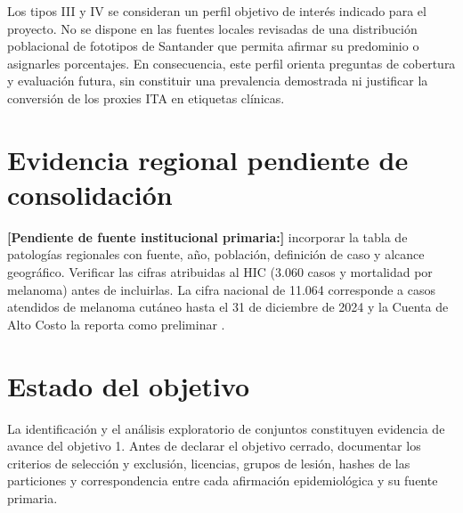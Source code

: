 Los tipos III y IV se consideran un perfil objetivo de interés indicado para el proyecto. No se dispone en las fuentes locales revisadas de una distribución poblacional de fototipos de Santander que permita afirmar su predominio o asignarles porcentajes. En consecuencia, este perfil orienta preguntas de cobertura y evaluación futura, sin constituir una prevalencia demostrada ni justificar la conversión de los proxies ITA en etiquetas clínicas.

\section{Evidencia regional pendiente de consolidación}

\noindent\textbf{[Pendiente de fuente institucional primaria:]} incorporar la tabla de patologías regionales con fuente, año, población, definición de caso y alcance geográfico. Verificar las cifras atribuidas al HIC (3.060 casos y mortalidad por melanoma) antes de incluirlas. La cifra nacional de 11.064 corresponde a casos atendidos de melanoma cutáneo hasta el 31 de diciembre de 2024 y la Cuenta de Alto Costo la reporta como preliminar \parencite{cuentaaltocosto2025melanoma}.

\section{Estado del objetivo}

La identificación y el análisis exploratorio de conjuntos constituyen evidencia de avance del objetivo 1. Antes de declarar el objetivo cerrado, documentar los criterios de selección y exclusión, licencias, grupos de lesión, hashes de las particiones y correspondencia entre cada afirmación epidemiológica y su fuente primaria.
